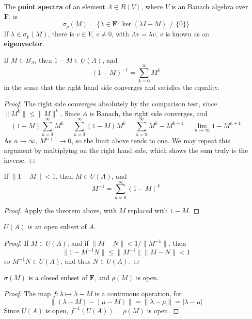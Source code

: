 \begin{definition}
    The {\bf point spectra} of an element $\Lambda \in B(V)$, where $V$ is an Banach algebra over $\mathbf{F}$, is
    \[ \sigma_p(M) = \{ \lambda \in \mathbf{F} : \ker(\lambda I - M) \neq \{ 0 \} \} \]
    If $\lambda \in \sigma_p(M)$, there is $v \in V$, $v \neq 0$, with $\Lambda v = \lambda v$. $v$ is known as an {\bf eigenvector}.
\end{definition}

\begin{lemma}
    If $M \in B_{A}$, then $1 - M \in U(A)$, and
    \[ (1 - M)^{-1} = \sum_{k = 0}^\infty M^k \]
    in the sense that the right hand side converges and satisfies the equality.
\end{lemma}
\begin{proof}
    The right side converges absolutely by the comparison test, since $\| M^k \| \leq \| M \|^k$. Since $A$ is Banach, the right side converges, and
    \[ (1 - M) \sum_{k = 0}^\infty M^k = \sum_{k = 0}^\infty (1 - M)M^k = \sum_{k = 0}^\infty M^k - M^{k+1} = \lim_{n \to \infty} 1 - M^{n+1} \]
    As $n \to \infty$, $M^{n+1} \to 0$, so the limit above tends to one. We may repeat this argument by multiplying on the right hand side, which shows the sum truly is the inverse.
\end{proof}

\begin{corollary}
    If $\| 1 - M \| < 1$, then $M \in U(A)$, and
    \[ M^{-1} = \sum_{k = 0}^\infty (1 - M)^k \]
\end{corollary}
\begin{proof}
    Apply the theorem above, with $M$ replaced with $1 - M$.
\end{proof}

\begin{corollary}
    $U(A)$ is an open subset of $A$.
\end{corollary}
\begin{proof}
    If $M \in U(A)$, and if $\| M - N \| < 1/\| M^{-1} \|$, then 
    \[ \| 1 - M^{-1}N \| \leq \| M^{-1} \| \| M - N \|  < 1 \]
    so $M^{-1}N \in U(A)$, and thus $N \in U(A)$.
\end{proof}

\begin{corollary}
    $\sigma(M)$ is a closed subset of $\mathbf{F}$, and $\rho(M)$ is open.
\end{corollary}
\begin{proof}
    The map $f: \lambda \mapsto \lambda - M$ is a continuous operation, for
    \[ \| (\lambda - M) - (\mu - M) \| = \| \lambda - \mu \| = | \lambda - \mu | \]
    Since $U(A)$ is open, $f^{-1}(U(A)) = \rho(M)$ is open.
\end{proof}

